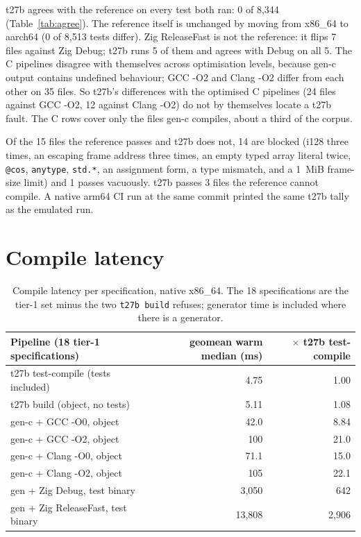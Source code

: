 \documentclass[11pt,a4paper]{article}
\begin{document}
t27b agrees with the reference on every test both ran: 0 of 8,344
(Table~\ref{tab:agree}). The reference itself is unchanged by moving from
x86\_64 to aarch64 (0 of 8,513 tests differ). Zig ReleaseFast is not the
reference: it flips 7 files against Zig Debug; t27b runs 5 of them and
agrees with Debug on all 5. The C pipelines disagree with themselves
across optimisation levels, because gen-c output contains undefined
behaviour; GCC -O2 and Clang -O2 differ from each other on 35 files. So
t27b's differences with the optimised C pipelines (24 files against GCC
-O2, 12 against Clang -O2) do not by themselves locate a t27b fault. The
C rows cover only the files gen-c compiles, about a third of the corpus.

Of the 15 files the reference passes and t27b does not, 14 are blocked
(i128 three times, an escaping frame address three times, an empty typed
array literal twice, \texttt{@cos}, \texttt{anytype}, \texttt{std.*}, an
assignment form, a type mismatch, and a 1~MiB frame-size limit) and 1
passes vacuously. t27b passes 3 files the reference cannot compile.
A native arm64 CI run at the same commit printed the same t27b tally as
the emulated run.

\section{Compile latency}
\label{sec:compile}

\begin{table}[h]
\centering
\small
\begin{tabular}{@{}lrr@{}}
\toprule
Pipeline (18 tier-1 specifications) & geomean warm median (ms) & $\times$ t27b test-compile \\
\midrule
t27b test-compile (tests included) & 4.75 & 1.00 \\
t27b build (object, no tests) & 5.11 & 1.08 \\
gen-c + GCC -O0, object & 42.0 & 8.84 \\
gen-c + GCC -O2, object & 100 & 21.0 \\
gen-c + Clang -O0, object & 71.1 & 15.0 \\
gen-c + Clang -O2, object & 105 & 22.1 \\
gen + Zig Debug, test binary & 3,050 & 642 \\
gen + Zig ReleaseFast, test binary & 13,808 & 2,906 \\
\bottomrule
\end{tabular}
\caption{Compile latency per specification, native x86\_64. The 18
specifications are the tier-1 set minus the two \texttt{t27b build}
refuses; generator time is included where there is a generator.}
\label{tab:compile}
\end{table}
\end{document}
